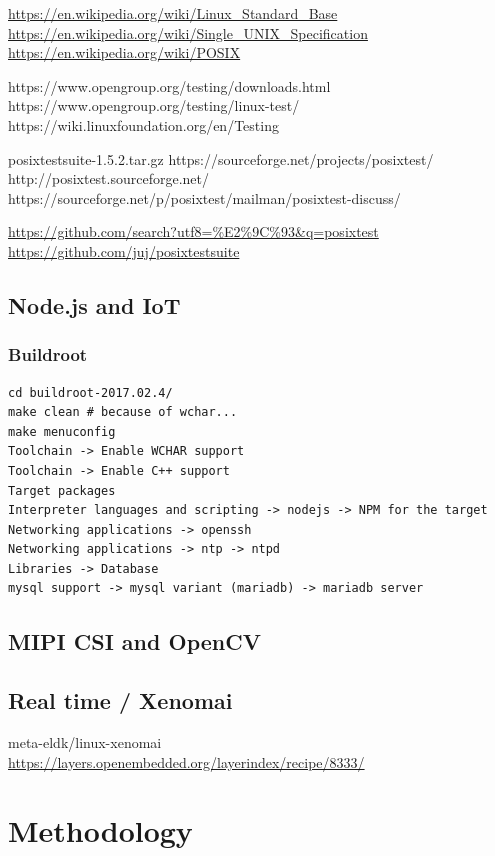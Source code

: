 \documentclass[printmode]{mgr}
\begin{document}
\url{https://en.wikipedia.org/wiki/Linux_Standard_Base}
\url{https://en.wikipedia.org/wiki/Single_UNIX_Specification}
\url{https://en.wikipedia.org/wiki/POSIX}

https://www.opengroup.org/testing/downloads.html
https://www.opengroup.org/testing/linux-test/
https://wiki.linuxfoundation.org/en/Testing

posixtestsuite-1.5.2.tar.gz
https://sourceforge.net/projects/posixtest/
http://posixtest.sourceforge.net/
https://sourceforge.net/p/posixtest/mailman/posixtest-discuss/

\url{https://github.com/search?utf8=\%E2\%9C\%93&q=posixtest}
\url{https://github.com/juj/posixtestsuite}

\section{Node.js and IoT}

\subsection{Buildroot}

\begin{lstlisting}
cd buildroot-2017.02.4/
make clean # because of wchar...
make menuconfig
Toolchain -> Enable WCHAR support
Toolchain -> Enable C++ support
Target packages
Interpreter languages and scripting -> nodejs -> NPM for the target
Networking applications -> openssh
Networking applications -> ntp -> ntpd
Libraries -> Database
mysql support -> mysql variant (mariadb) -> mariadb server
\end{lstlisting}


\section{MIPI CSI and OpenCV}

\section{Real time / Xenomai}

meta-eldk/linux-xenomai
\url{https://layers.openembedded.org/layerindex/recipe/8333/}

\chapter{Methodology}
\label{chapter:methodology}
\end{document}
